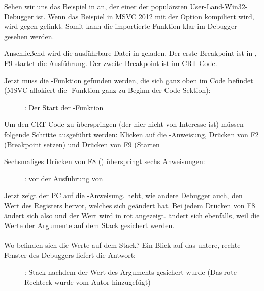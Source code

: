 \clearpage
{}
\myindex{\olly}

Sehen wir uns das Beispiel in \olly an, der einer der populärsten User-Land-Win32-Debugger ist.
Wenn das Beispiel in MSVC 2012 mit der Option  kompiliert wird, wird gegen  gelinkt.
Somit kann die importierte Funktion klar im Debugger gesehen werden.

Anschließend wird die ausführbare Datei in \olly geladen.
Der erste Breakpoint ist in , F9 startet die Ausführung.
Der zweite Breakpoint ist im \ac{CRT}-Code.

Jetzt muss die \main-Funktion gefunden werden, die sich ganz oben im Code befindet
(MSVC allokiert die \main-Funktion ganz zu Beginn der Code-Sektion): 
\begin{figure}[H]
\centering
{}
\caption{\olly: Der Start der \main-Funktion}
\label{fig:printf3_olly_1}
\end{figure}

Um den \ac{CRT}-Code zu überspringen (der hier nicht von Interesse ist) müssen
folgende Schritte ausgeführt werden: Klicken auf die -Anweisung,
Drücken von F2 (Breakpoint setzen) und Drücken von F9 (Starten

\clearpage
Sechsmaliges Drücken von F8 (\stepover) überspringt sechs Anweisungen:

\begin{figure}[H]
\centering
{}
\caption{\olly: vor der Ausführung von\printf}
\label{fig:printf3_olly_2}
\end{figure}

Jetzt zeigt der \ac{PC} auf die -Anweisung.
\olly hebt, wie andere Debugger auch, den Wert des Registers hervor, welches sich geändert hat.
Bei jedem Drücken von F8 ändert sich also \EIP und der Wert wird in rot angezeigt.
\ESP ändert sich ebenfalls, weil die Werte der Argumente auf dem Stack gesichert werden.\\
\\
Wo befinden sich die Werte auf dem Stack? Ein Blick auf das untere, rechte Fenster
des Debuggers liefert die Antwort:

\begin{figure}[H]
\centering

\caption{\olly: Stack nachdem der Wert des Arguments gesichert wurde (Das rote Rechteck wurde vom Autor hinzugefügt)}
\end{figure}

